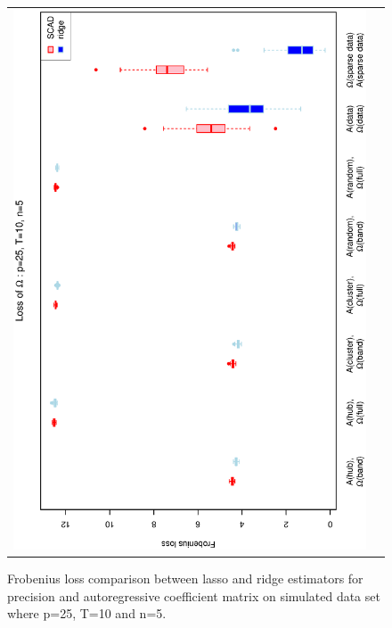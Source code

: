 \documentclass[a4paper]{article}
\begin{document}
\begin{figure}[h!]
\begin{tabular}{cc}
\includegraphics[scale=0.5,angle=270]{LossOmega25T10N5.eps}\\
\end{tabular}
\caption{Frobenius loss comparison between lasso and ridge estimators for precision and autoregressive coefficient matrix on simulated data set where p=25, T=10 and n=5.}
\label{fig:Loss25T10N5}
\end{figure}
\end{document}
